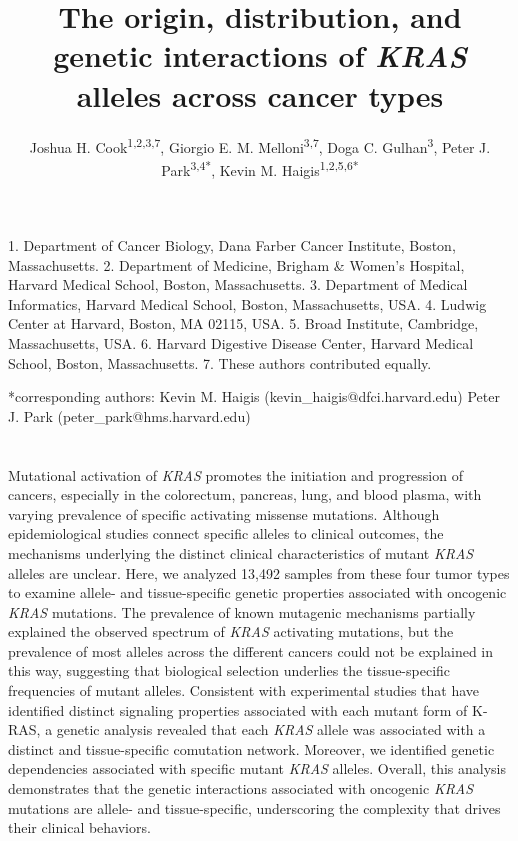 \documentclass[english, 10pt, letterpaper]{article}
\title{The origin, distribution, and genetic interactions of \emph{KRAS} alleles across cancer types}
\author{
    Joshua H. Cook\textsuperscript{1,2,3,7},
    Giorgio E. M. Melloni\textsuperscript{3,7}, 
    Doga C. Gulhan\textsuperscript{3}, 
    Peter J. Park\textsuperscript{3,4{*}}, 
    Kevin M. Haigis\textsuperscript{1,2,5,6{*}}
}
\newcommand{\KRAS}{\emph{KRAS}}
\newcommand{\kras}{K-RAS}
\begin{document}

\maketitle

\thispagestyle{fancy}

1. Department of Cancer Biology, Dana Farber Cancer Institute, Boston, Massachusetts.
2. Department of Medicine, Brigham \& Women’s Hospital, Harvard Medical School, Boston, Massachusetts.
3. Department of Medical Informatics, Harvard Medical School, Boston, Massachusetts, USA.
4. Ludwig Center at Harvard, Boston, MA 02115, USA.
5. Broad Institute, Cambridge, Massachusetts, USA.
6. Harvard Digestive Disease Center, Harvard Medical School, Boston, Massachusetts.
7. These authors contributed equally.

{*}corresponding authors:
\newline{} \hspace*{1cm} Kevin M. Haigis (kevin\_haigis@dfci.harvard.edu)
\newline{} \hspace*{1cm} Peter J. Park (peter\_park@hms.harvard.edu)

\newpage
\section*{}
Mutational activation of \KRAS{} promotes the initiation and progression of cancers, especially in the colorectum, pancreas, lung, and blood plasma, with varying prevalence of specific activating missense mutations. 
Although epidemiological studies connect specific alleles to clinical outcomes, the mechanisms underlying the distinct clinical characteristics of mutant \KRAS{} alleles are unclear. 
Here, we analyzed 13,492 samples from these four tumor types to examine allele- and tissue-specific genetic properties associated with oncogenic \KRAS{} mutations. 
The prevalence of known mutagenic mechanisms partially explained the observed spectrum of \KRAS{} activating mutations, but the prevalence of most alleles across the different cancers could not be explained in this way, suggesting that biological selection underlies the tissue-specific frequencies of mutant alleles. 
Consistent with experimental studies that have identified distinct signaling properties associated with each mutant form of \kras{}, a genetic analysis revealed that each \KRAS{} allele was associated with a distinct and tissue-specific comutation network. 
Moreover, we identified genetic dependencies associated with specific mutant \KRAS{} alleles. 
Overall, this analysis demonstrates that the genetic interactions associated with oncogenic \KRAS{} mutations are allele- and tissue-specific, underscoring the complexity that drives their clinical behaviors. 
\newpage
\end{document}
